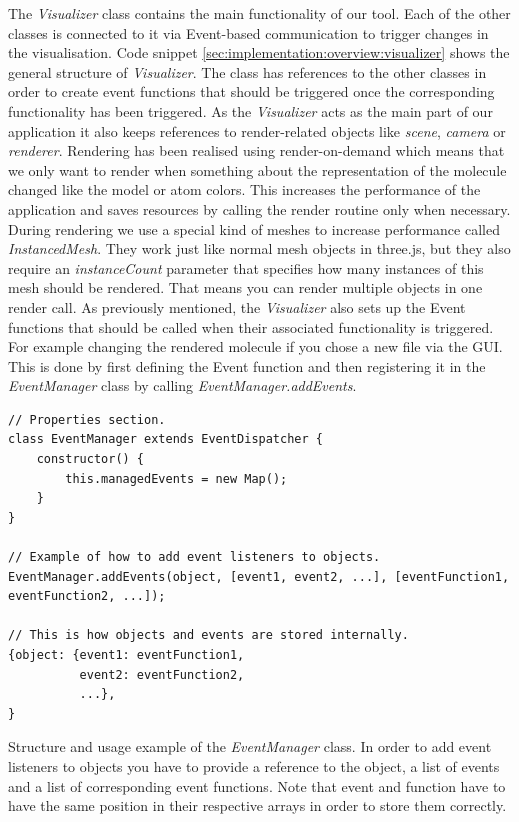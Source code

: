 The \textit{Visualizer} class contains the main functionality of our tool. Each of the other classes is connected to it via Event-based communication to trigger changes in the visualisation. Code snippet \ref{sec:implementation:overview:visualizer} shows the general structure of \textit{Visualizer}. The class has references to the other classes in order to create event functions that should be triggered once the corresponding functionality has been triggered. As the \textit{Visualizer} acts as the main part of our application it also keeps references to render-related objects like \textit{scene}, \textit{camera} or \textit{renderer}. Rendering has been realised using render-on-demand which means that we only want to render when something about the representation of the molecule changed like the model or atom colors. This increases the performance of the application and saves resources by calling the render routine only when necessary. During rendering we use a special kind of meshes to increase performance called \textit{InstancedMesh}. They work just like normal mesh objects in three.js, but they also require an \textit{instanceCount} parameter that specifies how many instances of this mesh should be rendered. That means you can render multiple objects in one render call. As previously mentioned, the \textit{Visualizer} also sets up the Event functions that should be called when their associated functionality is triggered. For example changing the rendered molecule if you chose a new file via the GUI. This is done by first defining the Event function and then registering it in the \textit{EventManager} class by calling \textit{EventManager.addEvents}.

\begin{listing}[H]
\begin{verbatim}
// Properties section.
class EventManager extends EventDispatcher {
	constructor() {
		this.managedEvents = new Map();
	}
}

// Example of how to add event listeners to objects.
EventManager.addEvents(object, [event1, event2, ...], [eventFunction1, eventFunction2, ...]);

// This is how objects and events are stored internally.
{object: {event1: eventFunction1,
          event2: eventFunction2,
          ...},
}
\end{verbatim}
\caption{Structure and usage example of the \textit{EventManager} class. In order to add event listeners to objects you have to provide a reference to the object, a list of events and a list of corresponding event functions. Note that event and function have to have the same position in their respective arrays in order to store them correctly.}
\label{sec:implementation:overview:eventmanager}
\end{listing}

